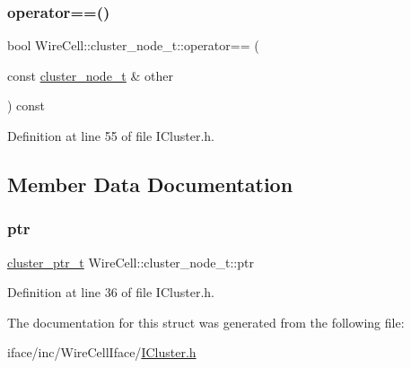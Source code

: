 \subsubsection{\texorpdfstring{operator==()}{operator==()}}
{\footnotesize\ttfamily bool Wire\+Cell\+::cluster\+\_\+node\+\_\+t\+::operator== (\begin{DoxyParamCaption}\item[{const \hyperlink{struct_wire_cell_1_1cluster__node__t}{cluster\+\_\+node\+\_\+t} \&}]{other }\end{DoxyParamCaption}) const\hspace{0.3cm}{\ttfamily [inline]}}



Definition at line 55 of file I\+Cluster.\+h.



\subsection{Member Data Documentation}
\mbox{\label{struct_wire_cell_1_1cluster__node__t_a9ae0d1a54a70bf0ab117a76ff07dd682}} 
\subsubsection{\texorpdfstring{ptr}{ptr}}
{\footnotesize\ttfamily \hyperlink{namespace_wire_cell_a0dd058393dc7c7e35d888c206b9d479d}{cluster\+\_\+ptr\+\_\+t} Wire\+Cell\+::cluster\+\_\+node\+\_\+t\+::ptr}



Definition at line 36 of file I\+Cluster.\+h.



The documentation for this struct was generated from the following file\+:\begin{DoxyCompactItemize}
\item 
iface/inc/\+Wire\+Cell\+Iface/\hyperlink{_i_cluster_8h}{I\+Cluster.\+h}\end{DoxyCompactItemize}
